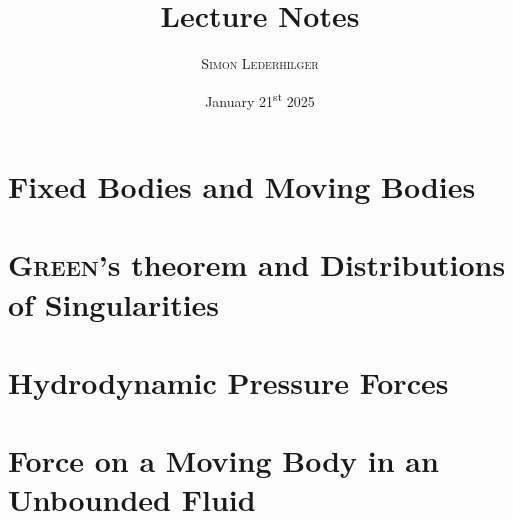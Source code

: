 \documentclass{article}
\title{Lecture Notes}
\subtitle{\textit{\headcourse}}
\author{\textsc{Simon Lederhilger}}
\date{January 21\textsuperscript{st} 2025}
\begin{document}
\maketitle\thispagestyle{fancy}
\begin{multicols*}{2}
\section[Bodies in Fluid]{Fixed Bodies and Moving Bodies}


\section[Green's Theorem]{\textsc{Green}'s theorem and Distributions of Singularities}


\section[Pressure Forces]{Hydrodynamic Pressure Forces}


\section[Force on Geometry]{Force on a Moving Body in an Unbounded Fluid}


\end{multicols*}
\end{document}
